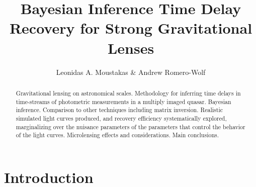 \documentclass{emulateapj}
\begin{document}
\title{Bayesian Inference Time Delay Recovery for Strong Gravitational Lenses}

\author{Leonidas A. Moustakas \& Andrew Romero-Wolf}

\begin{abstract}
  Gravitational  lensing  on   astronomical  scales.  Methodology  for
  inferring time delays in time-streams of photometric measurements in
  a multiply  imaged quasar.  Bayesian inference.  Comparison to other
  techniques  including matrix  inversion.  Realistic  simulated light
  curves  produced, and  recovery efficiency  systematically explored,
  marginalizing over  the nuisance  parameters of the  parameters that
  control the behavior of  the light curves.  Microlensing effects and
  considerations.  Main conclusions.
\end{abstract}
 

\section{Introduction}



\end{document}
